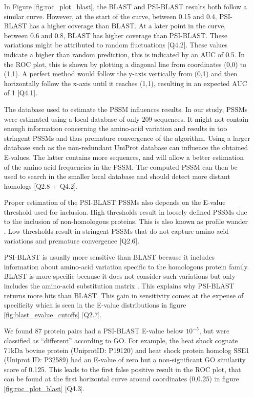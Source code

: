 \documentclass{article}
\begin{document}
In Figure \ref{fig:roc_plot_blast}, the BLAST and PSI-BLAST results both follow a similar curve. However, at the start of the curve, between 0.15 and 0.4, PSI-BLAST has a higher coverage than BLAST. At a later point in the curve, between 0.6 and 0.8, BLAST has higher coverage than PSI-BLAST. These variations might be attributed to random fluctuations [Q4.2]. These values indicate a higher than random prediction, this is indicated by an AUC of 0.5. In the ROC plot, this is shown by plotting a diagonal line from coordinates (0,0) to (1,1). A perfect method would follow the y-axis vertically from (0,1) and then horizontally follow the x-axis until it reaches (1,1), resulting in an expected AUC of 1 [Q4.1].

The database used to estimate the PSSM influences results. In our study, PSSMs were estimated using a local database of only 209 sequences. It might not contain enough information concerning the amino-acid variation and results in too stringent PSSMs and thus premature convergence of the algorithm. Using a larger database such as the non-redundant UniProt database can influence the obtained E-values. The latter contains more sequences, and will allow a better estimation of the amino acid frequencies in the PSSM. The computed PSSM can then be used to search in the smaller local database and should detect more distant homologs [Q2.8 + Q4.2].

\newpage

Proper estimation of the PSI-BLAST PSSMs also depends on the E-value threshold used for inclusion. High thresholds result in loosely defined PSSMs due to the inclusion of non-homologous proteins. This is also known as profile wander \citep{jaap}. Low thresholds result in stringent PSSMs that do not capture amino-acid variations and premature convergence [Q2.6]. 

PSI-BLAST is usually more sensitive than BLAST because it includes information about amino-acid variation specific to the homologous protein family. BLAST is more specific because it does not consider such variations but only includes the amino-acid substitution matrix \citep{bhagwat_psi-blast_2007}. This explains why PSI-BLAST returns more hits than BLAST. This gain in sensitivity comes at the expense of specificity which is seen in the E-value distributions in figure \ref{fig:blast_evalue_cutoffs} [Q2.7].

We found 87 protein pairs had a PSI-BLAST E-value below $10^{-5}$, but were classified as ``different'' according to GO. For example, the heat shock cognate 71kDa bovine protein (UniprotID: P19120) and heat shock protein homolog SSE1 (Uniprot ID: P32589) had an E-value of zero but a non-significant GO similarity score of 0.125. This leads to the first false positive result in the ROC plot, that can be found at the first horizontal curve around coordinates (0,0.25) in figure \ref{fig:roc_plot_blast} [Q4.3].
\end{document}
